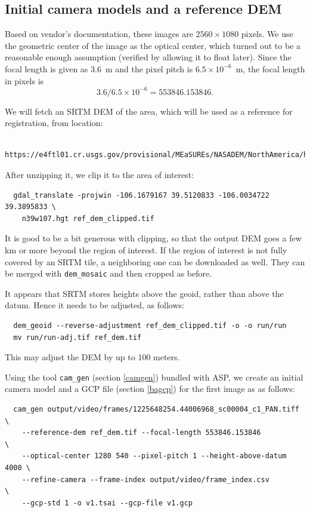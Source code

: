 \subsection{Initial camera models and a reference DEM}
\label{refdem}

Based on vendor's documentation, these images are $2560 \times 1080$
pixels.  We use the geometric center of the image as the optical center,
which turned out to be a reasonable enough assumption (verified by
allowing it to float later). Since the focal length is given as 3.6~m and
the pixel pitch is $6.5 \times 10^{-6}$~m, the focal length in pixels is
$$
  3.6/6.5 \times 10^{-6} = 553846.153846. 
$$

We will fetch an SRTM DEM of the area, which will be used as a reference
for registration, from location: 

\begin{verbatim}
  https://e4ftl01.cr.usgs.gov/provisional/MEaSUREs/NASADEM/NorthAmerica/hgt_merge/n39w107.hgt.zip
\end{verbatim}

After unzipping it, we clip it to the area of interest:

\begin{verbatim}
  gdal_translate -projwin -106.1679167 39.5120833 -106.0034722 39.3895833 \
    n39w107.hgt ref_dem_clipped.tif
\end{verbatim}

It is good to be a bit generous with clipping, so that the output DEM
goes a few km or more beyond the region of interest. If the region of
interest is not fully covered by an SRTM tile, a neighboring one can be
downloaded as well.  They can be merged with \texttt{dem\_mosaic} and
then cropped as before.

It appears that SRTM stores heights above the geoid, rather than above the datum.
Hence it needs to be adjusted, as follows:

\begin{verbatim}
  dem_geoid --reverse-adjustment ref_dem_clipped.tif -o -o run/run 
  mv run/run-adj.tif ref_dem.tif
\end{verbatim}

This may adjust the DEM by up to 100 meters. 

Using the tool \texttt{cam\_gen} (section \ref{camgen}) 
bundled with ASP, we create an initial camera model and a GCP file (section \ref{bagcp})
for the first image as as follows:

\begin{verbatim}
  cam_gen output/video/frames/1225648254.44006968_sc00004_c1_PAN.tiff   \
    --reference-dem ref_dem.tif --focal-length 553846.153846            \
    --optical-center 1280 540 --pixel-pitch 1 --height-above-datum 4000 \
    --refine-camera --frame-index output/video/frame_index.csv          \
    --gcp-std 1 -o v1.tsai --gcp-file v1.gcp
\end{verbatim}

